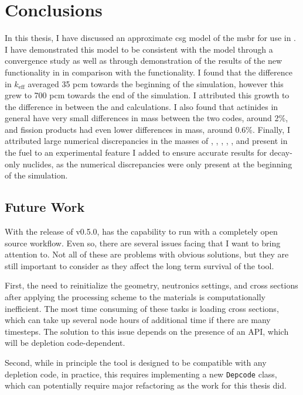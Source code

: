 \chapter{Conclusions}
\label{ch:chapter6}
\glsresetall

In this thesis, I have discussed an approximate \Gls{csg} model of the
\Gls{msbr} for use in \OpenMC. I have demonstrated this model to be consistent
with the \SerpentTWO model through a convergence study as well as
through demonstration of the results of the new \OpenMC functionality in
\SaltProc in comparison with the \SerpentTWO functionality.
I found that the difference in $k_\text{eff}$ averaged 35 pcm
towards the beginning of the simulation, however this grew to
700 pcm towards the end of the simulation. I attributed this growth
to the difference in  between the \OpenMC and \SerpentTWO
calculations. I also found that actinides in general have very small
differences in mass between the two codes, around 2\%, and fission products
had even lower differences in mass, around 0.6\%. Finally, I attributed
large numerical discrepancies in the masses of , ,
, , , and  present in the fuel
to an experimental \OpenMC feature I added to ensure accurate results for decay-only
nuclides, as the numerical discrepancies were only present at the beginning of the simulation.

\section{Future Work}
With the release of v0.5.0, \SaltProc has the capability to run
with a completely open source workflow. Even so, there are several issues facing \SaltProc
that I want to bring attention to. Not all of these are problems with obvious
solutions, but they are still important to consider as they affect the long
term survival of the tool.

First, the need to reinitialize the geometry, neutronics
settings, and cross sections after applying the processing scheme to the
materials is computationally inefficient. The most time consuming of these tasks
is loading cross sections, which can take up several node hours of additional
time if there are many timesteps. The solution to this issue depends on
the presence of an API, which will be depletion code-dependent.

Second, while in principle the tool is
designed to be compatible with any depletion code, in practice, this requires
implementing a new \verb.Depcode. class, which can potentially require major
refactoring as the work for this thesis did.

